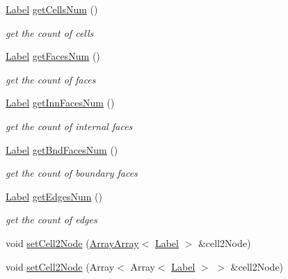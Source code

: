 \begin{DoxyCompactItemize}
\hyperlink{namespaceHSF_ae65d72be782e989396ebe5ec6ae4c2b6}{Label} \hyperlink{classHSF_1_1Topology_ae29fdf46363c034e08ba9a7b6eaeb912}{getCellsNum} ()
\begin{DoxyCompactList}\small\item\em get the count of cells \item\end{DoxyCompactList}\item 
\hyperlink{namespaceHSF_ae65d72be782e989396ebe5ec6ae4c2b6}{Label} \hyperlink{classHSF_1_1Topology_ad9ec7de46508d5c6f2d3307b84c2bcb0}{getFacesNum} ()
\begin{DoxyCompactList}\small\item\em get the count of faces \item\end{DoxyCompactList}\item 
\hyperlink{namespaceHSF_ae65d72be782e989396ebe5ec6ae4c2b6}{Label} \hyperlink{classHSF_1_1Topology_a7b260fdf67cfe1290b8302fa46b79e70}{getInnFacesNum} ()
\begin{DoxyCompactList}\small\item\em get the count of internal faces \item\end{DoxyCompactList}\item 
\hyperlink{namespaceHSF_ae65d72be782e989396ebe5ec6ae4c2b6}{Label} \hyperlink{classHSF_1_1Topology_a14bba9407c2c026f94acbd9915bfa2a0}{getBndFacesNum} ()
\begin{DoxyCompactList}\small\item\em get the count of boundary faces \item\end{DoxyCompactList}\item 
\hyperlink{namespaceHSF_ae65d72be782e989396ebe5ec6ae4c2b6}{Label} \hyperlink{classHSF_1_1Topology_aacb3bbf08010f13016ac3db329f18bb8}{getEdgesNum} ()
\begin{DoxyCompactList}\small\item\em get the count of edges \item\end{DoxyCompactList}\item 
void \hyperlink{classHSF_1_1Topology_a6a372d4d321126c3626c27f777753729}{setCell2Node} (\hyperlink{classHSF_1_1ArrayArray}{ArrayArray}$<$ \hyperlink{namespaceHSF_ae65d72be782e989396ebe5ec6ae4c2b6}{Label} $>$ \&cell2Node)
\item 
void \hyperlink{classHSF_1_1Topology_a947e781930ba1bbf355970af289e35ba}{setCell2Node} (Array$<$ Array$<$ \hyperlink{namespaceHSF_ae65d72be782e989396ebe5ec6ae4c2b6}{Label} $>$ $>$ \&cell2Node)

\end{DoxyCompactItemize}
